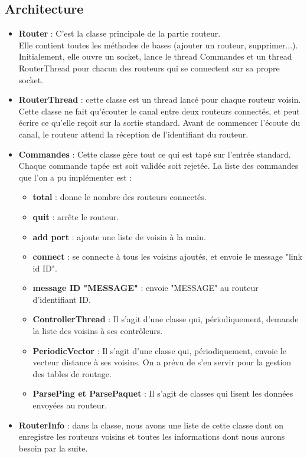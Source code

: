 \subsection{Architecture}
\begin{itemize}
\item \textbf{Router} : C'est la classe principale de la partie routeur. \\
	Elle contient toutes les méthodes de bases (ajouter un routeur,
	supprimer...). \\
	    Initialement, elle ouvre un socket, lance le thread Commandes
	    et un thread RouterThread pour chacun des routeurs qui se
	    connectent sur sa propre socket.
\item \textbf{RouterThread} : cette classe est un thread lancé pour chaque
	    routeur voisin. \\
	    Cette classe ne fait qu'écouter le canal entre
	    deux routeurs connectés, et peut écrire ce qu'elle reçoit sur la
	    sortie standard. Avant de commencer l'écoute
	    du canal, le routeur attend la réception de l'identifiant du
	    routeur.
\item \textbf{Commandes} : Cette classe gère tout ce qui est tapé sur l'entrée
	    standard. Chaque commande tapée est soit validée soit rejetée.
	    La liste des commandes que l'on a pu implémenter est :
	    \begin{itemize}
		    \item \textbf{total}    : donne le nombre des routeurs connectés.
		    \item \textbf{quit}     : arrête le routeur.
		    \item \textbf{add port} : ajoute une liste de voisin à la main.
		    \item \textbf{connect}  : se connecte à tous les voisins ajoutés,
			et envoie le message "link id ID".
		    \item \textbf{message ID "MESSAGE"} : envoie "MESSAGE" au routeur
			d'identifiant ID.
\item \textbf{ControllerThread} : Il s'agit d'une classe qui, périodiquement, demande la liste des voisins à ses contrôleurs.
\item \textbf{PeriodicVector} : Il s'agit d'une classe qui, périodiquement, envoie le vecteur distance à ses voisins. On a prévu de s'en servir pour la gestion des tables de routage.
\item \textbf{ParsePing et ParsePaquet} : Il s'agit de classes qui lisent les données envoyées au routeur.
	    \end{itemize}
\item \textbf{RouterInfo} : dans la classe, nous avons une liste de cette
	    classe dont on enregistre les routeurs voisins et toutes les
	    informations dont nous aurons besoin par la suite.
\end{itemize}

